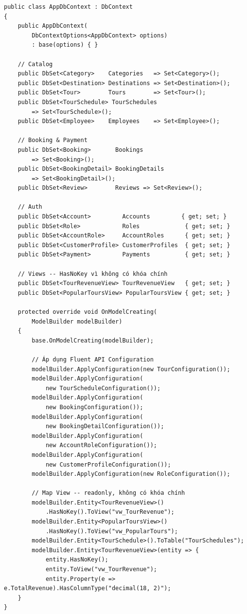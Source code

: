 \begin{lstlisting}[style=csharp,
  caption={AppDbContext -- 13 DbSet và cấu hình View},
  label={lst:dbctx}]
public class AppDbContext : DbContext
{
    public AppDbContext(
        DbContextOptions<AppDbContext> options)
        : base(options) { }

    // Catalog
    public DbSet<Category>    Categories   => Set<Category>();
    public DbSet<Destination> Destinations => Set<Destination>();
    public DbSet<Tour>        Tours        => Set<Tour>();
    public DbSet<TourSchedule> TourSchedules
        => Set<TourSchedule>();
    public DbSet<Employee>    Employees    => Set<Employee>();

    // Booking & Payment
    public DbSet<Booking>       Bookings
        => Set<Booking>();
    public DbSet<BookingDetail> BookingDetails
        => Set<BookingDetail>();
    public DbSet<Review>        Reviews => Set<Review>();

    // Auth
    public DbSet<Account>         Accounts         { get; set; }
    public DbSet<Role>            Roles             { get; set; }
    public DbSet<AccountRole>     AccountRoles      { get; set; }
    public DbSet<CustomerProfile> CustomerProfiles  { get; set; }
    public DbSet<Payment>         Payments          { get; set; }

    // Views -- HasNoKey vì không có khóa chính
    public DbSet<TourRevenueView> TourRevenueView   { get; set; }
    public DbSet<PopularToursView> PopularToursView { get; set; }

    protected override void OnModelCreating(
        ModelBuilder modelBuilder)
    {
        base.OnModelCreating(modelBuilder);

        // Áp dụng Fluent API Configuration
        modelBuilder.ApplyConfiguration(new TourConfiguration());
        modelBuilder.ApplyConfiguration(
            new TourScheduleConfiguration());
        modelBuilder.ApplyConfiguration(
            new BookingConfiguration());
        modelBuilder.ApplyConfiguration(
            new BookingDetailConfiguration());
        modelBuilder.ApplyConfiguration(
            new AccountRoleConfiguration());
        modelBuilder.ApplyConfiguration(
            new CustomerProfileConfiguration());
        modelBuilder.ApplyConfiguration(new RoleConfiguration());

        // Map View -- readonly, không có khóa chính
        modelBuilder.Entity<TourRevenueView>()
            .HasNoKey().ToView("vw_TourRevenue");
        modelBuilder.Entity<PopularToursView>()
            .HasNoKey().ToView("vw_PopularTours");
        modelBuilder.Entity<TourSchedule>().ToTable("TourSchedules");
        modelBuilder.Entity<TourRevenueView>(entity => {
            entity.HasNoKey();
            entity.ToView("vw_TourRevenue");
            entity.Property(e => e.TotalRevenue).HasColumnType("decimal(18, 2)");
    }
}
\end{lstlisting}

